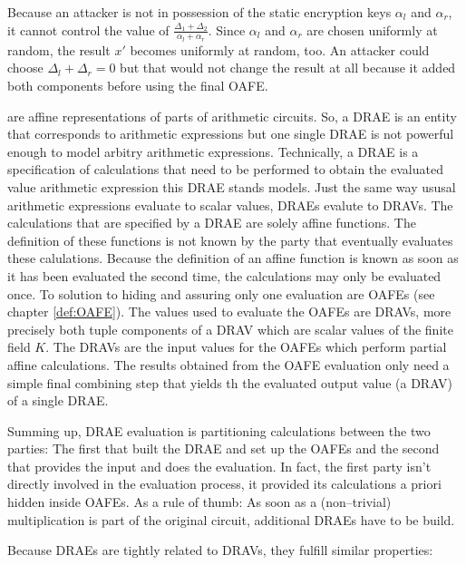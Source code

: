 Because an attacker is not in possession of the static encryption keys
$\alpha_l$ and $\alpha_r$, it cannot control the value of $\frac{\Delta_1 +
\Delta_2}{\alpha_l + \alpha_r}$. Since $\alpha_l$ and $\alpha_r$ are chosen
uniformly at random, the result $x'$ becomes uniformly at random, too. An
attacker could choose $\Delta_l + \Delta_r = 0$ but that would not change the
result at all because it added both components before using the final OAFE.


%
%
\label{sec:drae}

 are affine representations of
parts of arithmetic circuits. So, a DRAE is an entity that corresponds to
arithmetic expressions but one single DRAE is not powerful enough to model
arbitry arithmetic expressions. Technically, a DRAE is a specification of
calculations that need to be performed to obtain the evaluated value arithmetic
expression this DRAE stands models. Just the same way ususal arithmetic
expressions evaluate to scalar values, DRAEs evalute to DRAVs. The calculations
that are specified by a DRAE are solely affine functions. The definition of
these functions is not known by the party that eventually evaluates these
calulations. Because the definition of an affine function is known as soon as it
has been evaluated the second time, the calculations may only be evaluated once.
To solution to hiding and assuring only one evaluation are OAFEs (see chapter
\ref{def:OAFE}). The values used to evaluate the OAFEs are DRAVs, more precisely
both tuple components of a DRAV which are scalar values of the finite field $K$.
The DRAVs are the input values for the OAFEs which perform partial affine
calculations. The results obtained from the OAFE evaluation only need a simple
final combining step that yields th the evaluated output value (a DRAV) of a
single DRAE.

Summing up, DRAE evaluation is partitioning calculations between the two
parties: The first that built the DRAE and set up the OAFEs and the second that
provides the input and does the evaluation. In fact, the first party isn't
directly involved in the evaluation process, it provided its calculations
a priori hidden inside OAFEs.  As a rule of thumb: As soon as a (non--trivial)
multiplication is part of the original circuit, additional DRAEs have to be
build.

Because DRAEs are tightly related to DRAVs, they fulfill similar properties:

